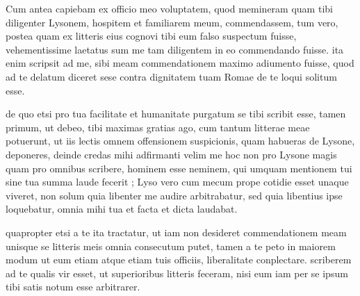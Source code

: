 


 Cum antea capiebam ex officio meo voluptatem, quod memineram quam tibi diligenter Lysonem, hospitem et familiarem meum, commendassem, tum vero, postea quam ex litteris eius cognovi tibi eum falso suspectum fuisse, vehementissime laetatus sum me tam diligentem in eo commendando fuisse. ita enim scripsit ad me, sibi meam commendationem maximo adiumento fuisse, quod ad te delatum diceret sese contra dignitatem tuam Romae de te loqui solitum esse.

 de quo etsi pro tua facilitate et humanitate purgatum se tibi scribit esse, tamen primum, ut debeo, tibi maximas gratias ago, cum tantum litterae meae potuerunt, ut iis lectis omnem offensionem suspicionis, quam habueras de Lysone, deponeres, deinde credas mihi adfirmanti velim me hoc non pro Lysone magis quam pro omnibus scribere, hominem esse neminem, qui umquam mentionem tui sine tua summa laude fecerit ; Lyso vero cum mecum prope cotidie esset unaque viveret, non solum quia libenter me audire arbitrabatur, sed quia libentius ipse loquebatur, omnia mihi tua et facta et dicta laudabat.

 quapropter etsi a te ita tractatur, ut iam non desideret commendationem meam unisque se litteris meis omnia consecutum putet, tamen a te peto in maiorem modum ut eum etiam atque etiam tuis officiis, liberalitate conplectare. scriberem ad te qualis vir esset, ut superioribus litteris feceram, nisi eum iam per se ipsum tibi satis notum esse arbitrarer.
